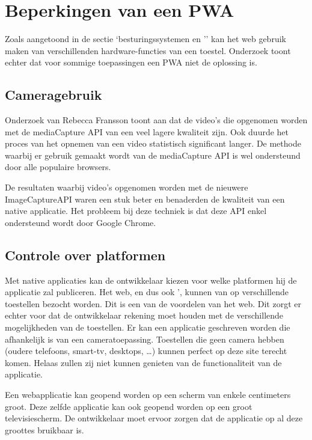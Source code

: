 \section{Beperkingen van een PWA}

Zoals aangetoond in de sectie ‘besturingssystemen en '’ kan het web gebruik maken van verschillenden hardware-functies van een toestel. Onderzoek toont echter dat voor sommige toepassingen een PWA niet de oplossing is.
\autocite{Malavolta2016}


\subsection{Cameragebruik}
	Onderzoek van Rebecca Fransson toont aan dat de video’s die opgenomen worden met de mediaCapture API van een veel lagere kwaliteit zijn. Ook duurde het proces van het opnemen van een video statistisch significant langer. De methode waarbij er gebruik gemaakt wordt van de mediaCapture API is wel ondersteund door alle populaire browsers.
	
	De resultaten waarbij video’s opgenomen worden met de nieuwere ImageCaptureAPI waren een stuk beter en benaderden de kwaliteit van een native applicatie. Het probleem bij deze techniek is dat deze API enkel ondersteund wordt door Google Chrome.
	\autocite{Fransson2017}
	

\subsection{Controle over platformen}
	
	Met native applicaties kan de ontwikkelaar kiezen voor welke platformen hij de applicatie zal publiceren. Het web, en dus ook ', kunnen van op verschillende toestellen bezocht worden. Dit is een van de voordelen van het web. Dit zorgt er echter voor dat de ontwikkelaar rekening moet houden met de verschillende mogelijkheden van de toestellen. Er kan een applicatie geschreven worden die afhankelijk is van een cameratoepassing. Toestellen die geen camera hebben (oudere telefoons, smart-tv, desktops, …) kunnen perfect op deze site terecht komen. Helaas zullen zij niet kunnen genieten van de functionaliteit van de applicatie.
	
	Een webapplicatie kan geopend worden op een scherm van enkele centimeters groot. Deze zelfde applicatie kan ook geopend worden op een groot televisiescherm. De ontwikkelaar moet ervoor zorgen dat de applicatie op al deze groottes bruikbaar is.
	
